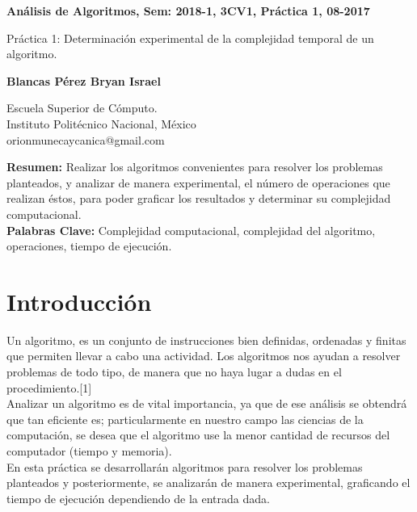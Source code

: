 \documentclass[12pt]{report}
\begin{document}
	
	\begin{center}
		\textbf{Análisis de Algoritmos, Sem: 2018-1, 3CV1, Práctica 1, 08-2017}
		\newline
	\end{center}
	
	\begin{center}
		\LARGE Práctica 1: Determinación experimental de
		la complejidad temporal de un algoritmo.\\
	\end{center}
	
	\begin{center}
		\textbf{Blancas Pérez Bryan Israel}\\
	\end{center}
	
	\begin{center}
		Escuela Superior de Cómputo.\\
		Instituto Politécnico Nacional, México\\
		orionmunecaycanica@gmail.com\\
	\end{center}
	
	
	\textbf{\large Resumen: }Realizar los algoritmos convenientes para resolver los problemas planteados, y analizar de manera experimental, el número de operaciones que realizan éstos, para poder graficar los resultados y determinar su complejidad computacional.\newline\\
	\textbf{\large Palabras Clave: }Complejidad computacional, complejidad del algoritmo, operaciones, tiempo de ejecución.\\
	
	\section{Introducción}
		Un algoritmo, es un conjunto de instrucciones bien definidas, ordenadas y finitas que permiten llevar a cabo una actividad. Los algoritmos nos ayudan a resolver problemas de todo tipo, de manera que no haya lugar a dudas en el procedimiento.[1]\\
		Analizar un algoritmo es de vital importancia, ya que de ese análisis se obtendrá que tan eficiente es; particularmente en nuestro campo las ciencias de la computación, se desea que el algoritmo use la menor cantidad de recursos del computador (tiempo y memoria).\\
		En esta práctica se desarrollarán algoritmos para resolver los problemas planteados y posteriormente, se analizarán de manera experimental, graficando el tiempo de ejecución dependiendo de la entrada dada.\newpage
	
\end{document}
